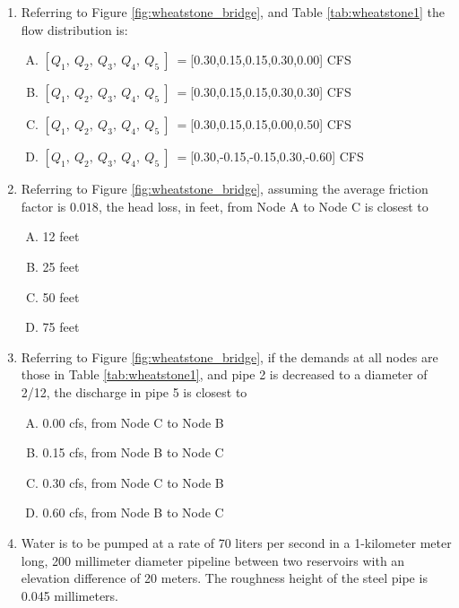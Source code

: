 \documentclass[11pt]{article}
\begin{document}
\begin{enumerate}



\item Referring to Figure \ref{fig:wheatstone_bridge}, and Table \ref{tab:wheatstone1} the flow distribution is:
\begin{enumerate}[(A)]
\item $[Q_1,~Q_2,~Q_3,~Q_4,~Q_5~]~=$[0.30,0.15,0.15,0.30,0.00] CFS
\item $[Q_1,~Q_2,~Q_3,~Q_4,~Q_5~]~=$[0.30,0.15,0.15,0.30,0.30] CFS
\item $[Q_1,~Q_2,~Q_3,~Q_4,~Q_5~]~=$[0.30,0.15,0.15,0.00,0.50] CFS
\item $[Q_1,~Q_2,~Q_3,~Q_4,~Q_5~]~=$[0.30,-0.15,-0.15,0.30,-0.60] CFS
\end{enumerate}
\item Referring to Figure \ref{fig:wheatstone_bridge}, assuming the average friction factor is $0.018$, the head loss, in feet, from Node A to Node C is closest to
\begin{enumerate}[(A)]
\item 12 feet 
\item 25 feet
\item 50 feet
\item 75 feet
\end{enumerate}
\item Referring to Figure \ref{fig:wheatstone_bridge}, if the demands at all nodes are those in Table \ref{tab:wheatstone1}, and pipe 2 is decreased to a diameter of 2/12, the discharge in pipe 5 is closest to
\begin{enumerate}[(A)]
\item 0.00 cfs, from Node C to Node B  %
\item 0.15 cfs, from Node B to Node C
\item 0.30 cfs, from Node C to Node B
\item 0.60 cfs, from Node B to Node C
\end{enumerate}
\clearpage
\item Water is to be pumped at a rate of 70 liters per second in a 1-kilometer meter long, 200 millimeter diameter pipeline between two reservoirs with an elevation difference of 20 meters.  The roughness height of the steel pipe is 0.045 millimeters.   


\end{enumerate}
\end{document}
